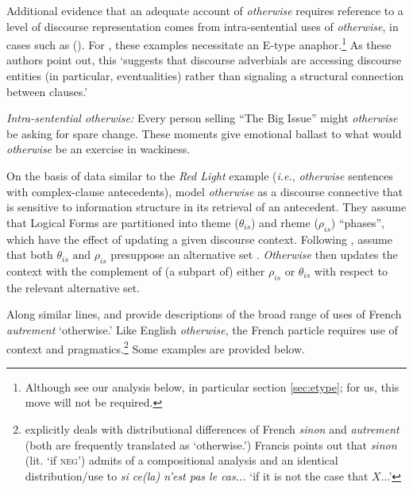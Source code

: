 Additional evidence that an adequate account of \textit{otherwise} requires reference to a level of discourse representation comes from intra-sentential uses of \textit{otherwise}, in cases such as (\nextx). For \citet[7]{Webber2001}, these examples necessitate an E-type anaphor.\footnote{Although see our analysis below, in particular section \ref{sec:etype}; for us, this move will not be required.} As these authors point out, this `suggests that discourse adverbials are accessing discourse entities (in particular, eventualities) rather than signaling a structural connection between clauses.'


\pex \label{Etype-intro} \textit{Intra-sentential \emph{otherwise}:}
\a \label{bigissue} Every person selling ``The Big Issue'' might \textit{otherwise} be asking for spare change. \hfill \citep[7]{Webber2001}
\a  These moments give emotional ballast to what would \textit{otherwise} be an exercise in wackiness. \xe%

On the basis of data similar to the \textit{Red Light} example (\textit{i.e.}, \textit{otherwise} sentences with complex-clause antecedents), \citet{Kruijff-Korbayova2001} model \textit{otherwise} as a discourse connective that is sensitive to information structure in its retrieval of an antecedent. They assume that Logical Forms are partitioned into theme ($ \theta_{is} $) and rheme ($ \rho_{is} $) ``phases'', which have the effect of updating a given discourse context. Following \citet{Steedman2000}, \citet{Kruijff-Korbayova2001} assume that both $ \theta_{is}\text{ and }\rho_{is} $ presuppose an alternative set \citep[cf.][]{Rooth1985}. \textit{Otherwise} then updates the context with the complement of (a subpart of) either $ \rho_{is} $ or $ \theta_{is} $ with respect to the relevant alternative set. 

Along similar lines, \citet{Inkova-Manzotti2002} and \citet{Flament-Boistrancourt2011} provide descriptions of the broad range of uses of French \textit{autrement} `otherwise.' Like English \textit{otherwise}, the French particle requires use of context and pragmatics.\footnote{\citet{Flament-Boistrancourt2011} explicitly deals with distributional differences of French \textit{sinon} and \textit{autrement} (both are frequently translated as `otherwise.') Francis \citet[252; pers. comm]
	{Corblin2002} points out that \textit{sinon} (lit. `if \textsc{neg}') admits of a compositional analysis and an identical distribution/use to \textit{si ce(la) n'est pas le cas...} `if it is not the case that $ X $...'}
Some examples are provided below.


